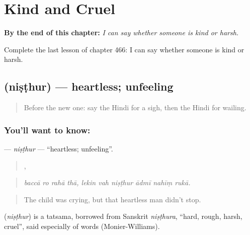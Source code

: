 
\chapter{Kind and Cruel}
\label{ch:hi-kind-and-cruel}

\begin{chapteropening}
\textbf{By the end of this chapter:} \emph{I can say whether someone is kind or harsh.}

Complete the last lesson of chapter 466: I can say whether someone is kind or harsh.
\end{chapteropening}

\section[\texorpdfstring{\hi{निष्ठुर} (niṣṭhur)}{निष्ठुर (niṣṭhur)}]{ (niṣṭhur) — heartless; unfeeling}

\label{lesson:HI-C466-nisthur}



\begin{quote}
Before the new one: say the Hindi for a sigh, then the Hindi for wailing.
\end{quote}

\subsection*{You'll want to know: }
\textbf{} — \emph{niṣṭhur} — \textquotedblleft{}heartless; unfeeling\textquotedblright{}.

\begin{quote}
   ,      
\end{quote}

\begin{quote}
\emph{baccā ro rahā thā, lekin vah niṣṭhur ādmī nahīṃ rukā.}
\end{quote}

\begin{quote}
The child was crying, but that heartless man didn't stop.
\end{quote}

\begin{cousinweb}
\textbf{} (\emph{niṣṭhur}) is a tatsama, borrowed from Sanskrit \emph{niṣṭhura}, \textquotedblleft{}hard, rough, harsh, cruel\textquotedblright{}, said especially of words (Monier-Williams).
\end{cousinweb}

